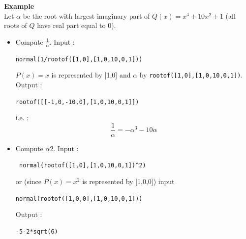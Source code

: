 \documentclass[a4paper,11pt]{book}
\begin{document}
{\bf Example}\\
Let $\alpha$ be the root with largest imaginary
part of $Q(x)=x^4+10x^2+1$ (all roots of $Q$ have real part equal to 0).
\begin{itemize}
\item Compute $\displaystyle \frac{1}{\alpha}$. Input :
\begin{center}{\tt normal(1/rootof([1,0],[1,0,10,0,1])) }\end{center}
$P(x)=x$ is represented by [1,0] and  $\alpha$
by {\tt rootof([1,0],[1,0,10,0,1])}.\\
Output :
\begin{center}{\tt rootof([[-1,0,-10,0],[1,0,10,0,1]])}\end{center}
i.e. :
\[  \frac{1}{\alpha}=-\alpha^3-10\alpha \]
\item Compute $\alpha2$. Input :
\begin{center}{\tt
    normal(rootof([1,0],[1,0,10,0,1])\verb|^|2)}\end{center}
or (since $P(x)=x^2$ is represented by [1,0,0]) input
\begin{center}{\tt normal(rootof([1,0,0],[1,0,10,0,1]))}\end{center}
Output :
\begin{center}{\tt -5-2*sqrt(6)}\end{center}
\end{itemize}
\end{document}
